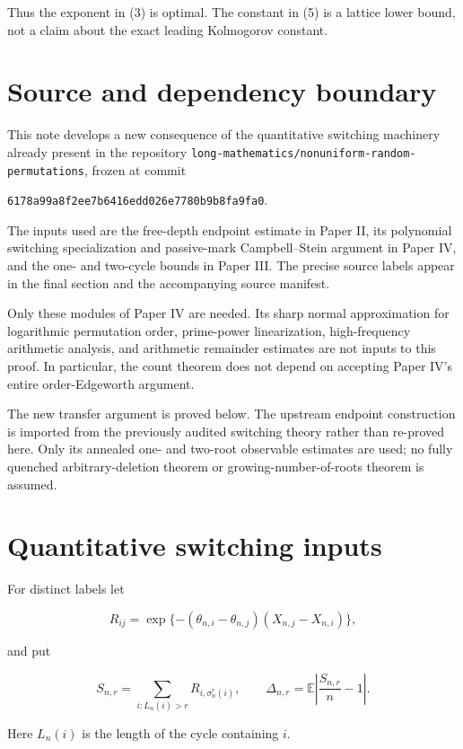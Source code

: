 \documentclass[
  11pt,
]{article}
\begin{document}
Thus the exponent in (3) is optimal. The constant in (5) is a lattice
lower bound, not a claim about the exact leading Kolmogorov constant.

\section{Source and dependency
boundary}\label{source-and-dependency-boundary}

This note develops a new consequence of the quantitative switching
machinery already present in the repository
\texttt{long-mathematics/nonuniform-random-permutations}, frozen at
commit

\texttt{6178a99a8f2ee7b6416edd026e7780b9b8fa9fa0}.

The inputs used are the free-depth endpoint estimate in Paper II, its
polynomial switching specialization and passive-mark Campbell--Stein
argument in Paper IV, and the one- and two-cycle bounds in Paper III.
The precise source labels appear in the final section and the
accompanying source manifest.

Only these modules of Paper IV are needed. Its sharp normal
approximation for logarithmic permutation order, prime-power
linearization, high-frequency arithmetic analysis, and arithmetic
remainder estimates are not inputs to this proof. In particular, the
count theorem does not depend on accepting Paper IV's entire
order-Edgeworth argument.

The new transfer argument is proved below. The upstream endpoint
construction is imported from the previously audited switching theory
rather than re-proved here. Only its annealed one- and two-root
observable estimates are used; no fully quenched arbitrary-deletion
theorem or growing-number-of-roots theorem is assumed.

\section{Quantitative switching
inputs}\label{quantitative-switching-inputs}

For distinct labels let

\[
R_{ij}=\exp\{-(\theta_{n,i}-\theta_{n,j})(X_{n,j}-X_{n,i})\},
\]

and put

\[
S_{n,r}=\sum_{i:L_n(i)>r}R_{i,\sigma_n^r(i)},
\qquad
\Delta_{n,r}=\mathbb E\left|\frac{S_{n,r}}n-1\right|.
\]

Here \(L_n(i)\) is the length of the cycle containing \(i\).
\end{document}
